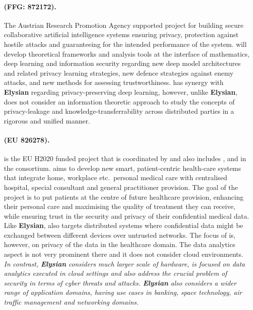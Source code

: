 \documentclass[a4paper,11pt]{article}
\newcommand{\project}[1]{\textbf{#1}\xspace}
\newcommand{\SECURITY}{\project{Elysian}}
\newcommand{\TheProject}{\SECURITY}
\begin{document}
\begin{mdframed}[backgroundcolor=blue!5]
\paragraph{\sthreeai (FFG: 872172).} The Austrian Research Promotion Agency supported \sthreeai project for building secure collaborative artificial intelligence systems ensuring privacy, protection against hostile attacks and guaranteeing for the intended performance of the system. \sthreeai will develop theoretical frameworks and analysis tools at the interface of mathematics, deep learning and information security regarding new deep model architectures and related privacy learning strategies, new defence strategies against enemy attacks, and new methods for assessing trustworthiness. \sthreeai has synergy with \TheProject{} regarding privacy-preserving deep learning, however, unlike \TheProject{}, \sthreeai does not consider an information theoretic approach to study the concepts of privacy-leakage and knowledge-transferrability across distributed parties in a rigorous and unified manner.    
\end{mdframed}

\begin{mdframed}[backgroundcolor=blue!5]
\paragraph{\serums (EU 826278).} \serums is the EU H2020 funded project that is coordinated by \USTANshort{} and also includes \SOPRAshort{}, \IBMshort{} and \SCCHshort{} in the consortium. \serums aims to develop new smart, patient-centric health-care systems that integrate home, workplace etc.~personal medical care with centralised hospital, special consultant and general practitioner provision. The goal of the \serums project is to put patients at the centre of future healthcare provision, enhancing their personal care and maximising the quality of treatment they can receive, while ensuring trust in the security and privacy of their confidential medical data. Like \TheProject{}, \serums also targets distributed systems where confidential data might be exchanged between different devices over untrusted networks. The focus of \serums is, however, on privacy of the data in the healthcare domain. The data analytics aspect is not very prominent there and it does not consider cloud environments. \emph{In contrast, \TheProject{} considers much larger scale of hardware, is focused on data analytics executed in cloud settings and also address the crucial problem of security in terms of cyber threats and attacks. \TheProject{} also considers a wider range of application domains, having use cases in banking, space technology, air traffic management and networking domains.}
\end{mdframed}
\end{document}

